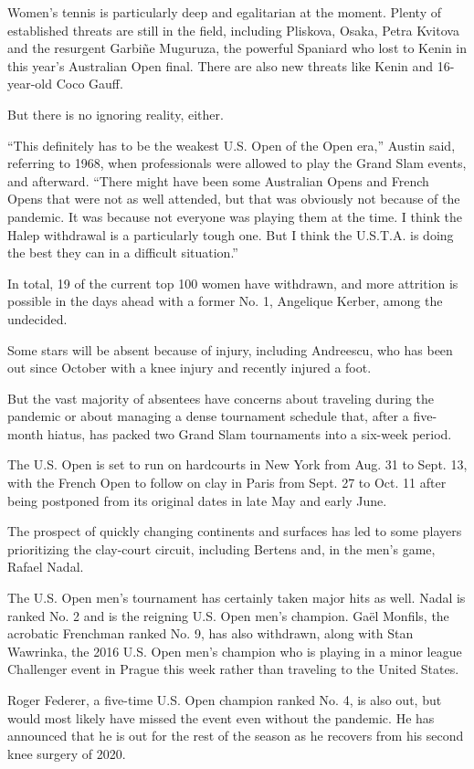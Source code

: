 Women's tennis is particularly deep and egalitarian at the moment.
Plenty of established threats are still in the field, including
Pliskova, Osaka, Petra Kvitova and the resurgent Garbiñe Muguruza, the
powerful Spaniard who lost to Kenin in this year's Australian Open
final. There are also new threats like Kenin and 16-year-old Coco Gauff.

But there is no ignoring reality, either.

``This definitely has to be the weakest U.S. Open of the Open era,''
Austin said, referring to 1968, when professionals were allowed to play
the Grand Slam events, and afterward. ``There might have been some
Australian Opens and French Opens that were not as well attended, but
that was obviously not because of the pandemic. It was because not
everyone was playing them at the time. I think the Halep withdrawal is a
particularly tough one. But I think the U.S.T.A. is doing the best they
can in a difficult situation.''

In total, 19 of the current top 100 women have withdrawn, and more
attrition is possible in the days ahead with a former No. 1, Angelique
Kerber, among the undecided.

Some stars will be absent because of injury, including Andreescu, who
has been out since October with a knee injury and recently injured a
foot.

But the vast majority of absentees have concerns about traveling during
the pandemic or about managing a dense tournament schedule that, after a
five-month hiatus, has packed two Grand Slam tournaments into a six-week
period.

The U.S. Open is set to run on hardcourts in New York from Aug. 31 to
Sept. 13, with the French Open to follow on clay in Paris from Sept. 27
to Oct. 11 after being postponed from its original dates in late May and
early June.

The prospect of quickly changing continents and surfaces has led to some
players prioritizing the clay-court circuit, including Bertens and, in
the men's game, Rafael Nadal.

The U.S. Open men's tournament has certainly taken major hits as well.
Nadal is ranked No. 2 and is the reigning U.S. Open men's champion. Gaël
Monfils, the acrobatic Frenchman ranked No. 9, has also withdrawn, along
with Stan Wawrinka, the 2016 U.S. Open men's champion who is playing in
a minor league Challenger event in Prague this week rather than
traveling to the United States.

Roger Federer, a five-time U.S. Open champion ranked No. 4, is also out,
but would most likely have missed the event even without the pandemic.
He has announced that he is out for the rest of the season as he
recovers from his second knee surgery of 2020.


